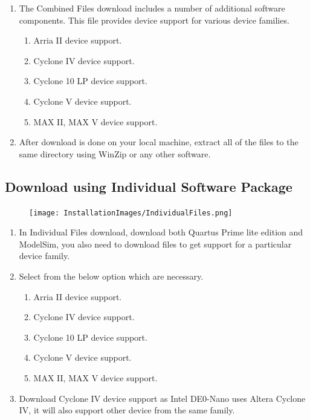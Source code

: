 \documentclass[12pt,singleside,a4paper]{article}
\begin{document}
\begin{enumerate}
    \item The Combined Files download includes a number of additional software components. This file provides device support for various device families.
    \begin{enumerate}
        \item Arria II device support. 
        \item Cyclone IV device support. 
        \item Cyclone 10 LP device support.  
        \item Cyclone V device support.
        \item MAX II, MAX V device support. 
    \end{enumerate}
    
    \item After download is done on your local machine, extract all of the files to the same directory using WinZip or any other software. 
        
\end{enumerate}

\subsection{Download using Individual Software Package }
\begin{figure}[H]
\centering
\texttt{[image: InstallationImages/IndividualFiles.png]}
\end{figure}
\begin{enumerate}
    \item In Individual Files download, download both Quartus Prime lite edition and ModelSim, you also need to download files to get support for a particular device family.
    \item Select from the below option which are necessary.
    \begin{enumerate}
        \item Arria II device support. 
        \item Cyclone IV device support. 
        \item Cyclone 10 LP device support.  
        \item Cyclone V device support.
        \item MAX II, MAX V device support. 
    \end{enumerate}
    \item Download Cyclone IV device support as Intel DE0-Nano uses Altera Cyclone IV, it will also support other device from the same family. 
        
\end{enumerate}
\end{document}
